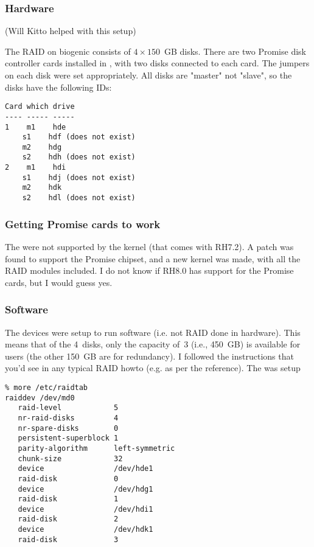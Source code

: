 \documentclass[12pt,twoside]{article}
\begin{document}
\subsubsection{Hardware}\label{sxn:raid_hrd}
(Will Kitto helped with this setup)

The RAID on biogenic consists of $4 \times 150$~GB 
disks. 
There are two Promise disk controller cards installed in
, with two disks connected to each card.
The jumpers on each disk were set appropriately.  
All disks are "master" not "slave", so the disks have the following
IDs: 

\begin{verbatim}
Card which drive
---- ----- -----
1    m1    hde
    s1    hdf (does not exist)
    m2    hdg
    s2    hdh (does not exist)
2    m1    hdi
    s1    hdj (does not exist)
    m2    hdk
    s2    hdl (does not exist)
\end{verbatim}

\subsubsection{Getting Promise cards to work}\label{sxn:raid_prm}
The  were not supported by the kernel (that
comes with RH7.2).
A patch was found to support the Promise chipset, and a new kernel was 
made, with all the RAID modules included.  
I do not know if RH8.0 has support for the Promise cards, but I would
guess yes. 

\subsubsection{Software}\label{sxn:raid_sw}
The devices were setup to run software  (i.e. not RAID done in 
hardware).
This means that of the 4~disks, only the capacity of~3 (i.e., 450~GB)
is available for users (the other 150~GB are for redundancy).
I followed the instructions that you'd see in any typical RAID howto
(e.g. as per the reference).
The  was setup 
\begin{verbatim}
% more /etc/raidtab
raiddev /dev/md0
   raid-level            5
   nr-raid-disks         4
   nr-spare-disks        0
   persistent-superblock 1
   parity-algorithm      left-symmetric
   chunk-size            32
   device                /dev/hde1
   raid-disk             0
   device                /dev/hdg1
   raid-disk             1
   device                /dev/hdi1
   raid-disk             2
   device                /dev/hdk1
   raid-disk             3
\end{verbatim}
\end{document}
